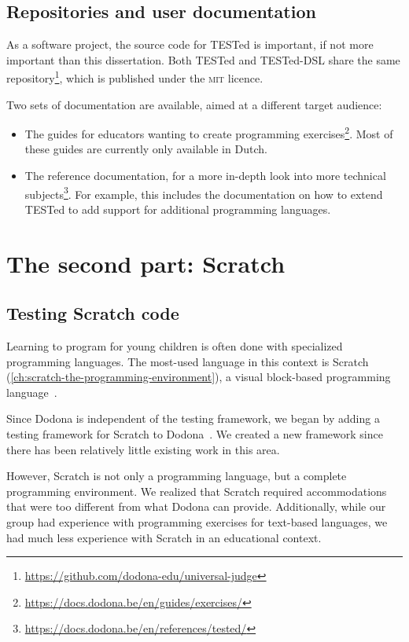 \documentclass[../main]{subfiles}
\begin{document}
\subsection{Repositories and user documentation}\label{subsec:repositories-and-code}

As a software project, the source code for TESTed is important, if not more important than this dissertation.
Both TESTed and TESTed-DSL share the same repository\footnote{\url{https://github.com/dodona-edu/universal-judge}}, which is published under the \textsc{mit} licence.

Two sets of documentation are available, aimed at a different target audience:

\begin{itemize}
    \item The guides for educators wanting to create programming exercises\footnote{\url{https://docs.dodona.be/en/guides/exercises/}}.
    Most of these guides are currently only available in Dutch.
    \item The reference documentation, for a more in-depth look into more technical subjects\footnote{\url{https://docs.dodona.be/en/references/tested/}}.
    For example, this includes the documentation on how to extend TESTed to add support for additional programming languages.
\end{itemize}

\section{The second part: Scratch}\label{sec:the-second-part:-scratch}

\subsection{Testing Scratch code}\label{subsec:testing-scrath-code}

Learning to program for young children is often done with specialized programming languages.
The most-used language in this context is Scratch (\cref{ch:scratch-the-programming-environment}), a visual block-based programming language~\autocite{resnickScratchProgrammingAll2009}.

Since Dodona is independent of the testing framework, we began by adding a testing framework for Scratch to Dodona~\autocite{makItchEenEducatief2019}.
We created a new framework since there has been relatively little existing work in this area.

However, Scratch is not only a programming language, but a complete programming environment.
We realized that Scratch required accommodations that were too different from what Dodona can provide.
Additionally, while our group had experience with programming exercises for text-based languages, we had much less experience with Scratch in an educational context.
\end{document}
